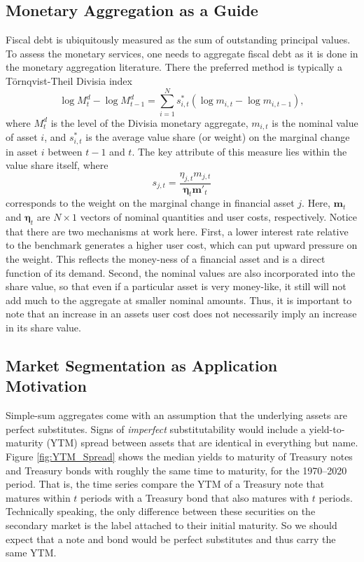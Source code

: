 \documentclass[11pt,a4paper,margin=1.5in]{article}
\begin{document}
\subsection{Monetary Aggregation as a Guide}
Fiscal debt is ubiquitously measured as the sum of outstanding principal values.
To assess the monetary services, one needs to aggregate fiscal debt as it is done in the monetary aggregation literature. 
There the preferred method is typically a T\"{o}rnqvist-Theil Divisia index
	\begin{equation*}
		\log{M^d_t} - \log{M^d_{t-1}} = \sum_{i=1}^{N}s^*_{i,t}\left(\log{m_{i,t}} - \log{m_{i,t-1}}\right),
		\label{DI}
	\end{equation*}
where $M^d_t$ is the level of the Divisia monetary aggregate, $m_{i,t}$ is the nominal value of asset $i$, and $s^*_{i,t}$ is the average value share (or weight) on the marginal change in asset $i$ between $t-1$ and $t$.
The key attribute of this measure lies within the value share itself, where
	\begin{equation*}
		s_{j,t}  = \frac{\eta_{j,t}m_{j,t}}{\boldsymbol \eta_t \mathbf{m'}_t} %
	\end{equation*}
corresponds to the weight on the marginal change in financial asset $j$.
Here, $\mathbf{m}_t$ and $\boldsymbol \eta_t$ are $N \times 1$ vectors of nominal quantities and user costs, respectively.
Notice that there are two mechanisms at work here.
First, a lower interest rate relative to the benchmark generates a higher user cost, which can put upward pressure on the weight.
This reflects the money-ness of a financial asset and is a direct function of its demand.
Second, the nominal values are also incorporated into the share value, so that even if a particular asset is very money-like, it still will not add much to the aggregate at smaller nominal amounts. 
Thus, it is important to note that an increase in an assets user cost does not necessarily imply an increase in its share value.

\subsection{Market Segmentation as Application Motivation}
\label{subsec:MktSeg}
Simple-sum aggregates come with an assumption that the underlying assets are perfect substitutes. 
Signs of {\em imperfect} substitutability would include a yield-to-maturity (YTM) spread between assets that are identical in everything but name.
Figure \ref{fig:YTM_Spread} shows the median yields to maturity of Treasury notes and Treasury bonds with roughly the same time to maturity, for the 1970--2020 period.
That is, the time series compare the YTM of a Treasury note that matures within $t$ periods with a Treasury bond that also matures with $t$ periods.
Technically speaking, the only difference between these securities on the secondary market is the label attached to their initial maturity.
So we should expect that a note and bond would be perfect substitutes and thus carry the same YTM.
\end{document}
